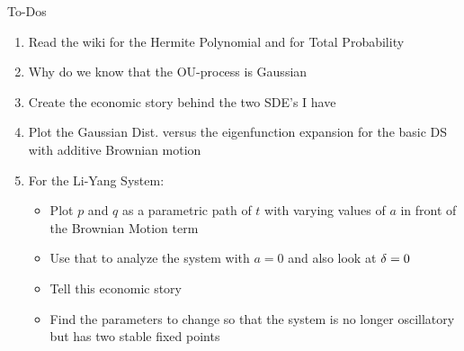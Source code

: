 To-Dos
\begin{enumerate}
	\item Read the wiki for the Hermite Polynomial and for Total Probability
	\item Why do we know that the OU-process is Gaussian
	\item Create the economic story behind the two SDE's I have %
	\item Plot the Gaussian Dist. versus the eigenfunction expansion for the basic DS with additive Brownian motion
	\item For the Li-Yang System:
	\begin{itemize}
		\item Plot $p$ and $q$ as a parametric path of $t$ with varying values of $a$ in front of the Brownian Motion term
		\item Use that to analyze the system with $a=0$ and also look at $\delta=0$
		\item Tell this economic story
		\item Find the parameters to change so that the system is no longer oscillatory but has two stable fixed points
	\end{itemize}
\end{enumerate}















